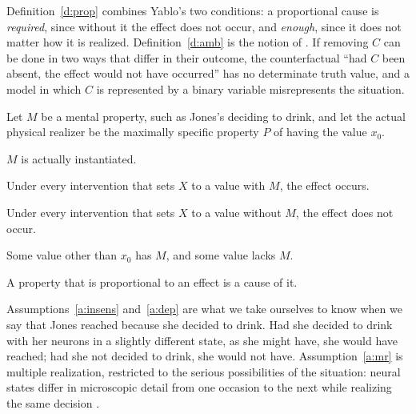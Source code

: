 \documentclass{situationist-preprint}
\begin{document}
Definition~\ref{d:prop} combines Yablo's two conditions: a proportional cause is \emph{required}, since without it the effect does not occur, and \emph{enough}, since it does not matter how it is realized. Definition~\ref{d:amb} is the notion of \citet{SpirtesScheines2004}. If removing $C$ can be done in two ways that differ in their outcome, the counterfactual \enquote{had $C$ been absent, the effect would not have occurred} has no determinate truth value, and a model in which $C$ is represented by a binary variable misrepresents the situation.

Let $M$ be a mental property, such as Jones's deciding to drink, and let the actual physical realizer be the maximally specific property $P$ of having the value $x_0$.

\begin{assumption}\label{a:actual}
$M$ is actually instantiated.
\end{assumption}

\begin{assumption}\label{a:insens}
Under every intervention that sets $X$ to a value with $M$, the effect occurs.
\end{assumption}

\begin{assumption}[Dependence]\label{a:dep}
Under every intervention that sets $X$ to a value without $M$, the effect does not occur.
\end{assumption}

\begin{assumption}\label{a:mr}
Some value other than $x_0$ has $M$, and some value lacks $M$.
\end{assumption}

\begin{principle}\label{p:cause}
A property that is proportional to an effect is a cause of it.
\end{principle}

Assumptions~\ref{a:insens} and~\ref{a:dep} are what we take ourselves to know when we say that Jones reached because she decided to drink. Had she decided to drink with her neurons in a slightly different state, as she might have, she would have reached; had she not decided to drink, she would not have. Assumption~\ref{a:mr} is multiple realization, restricted to the serious possibilities of the situation: neural states differ in microscopic detail from one occasion to the next while realizing the same decision \citep{Putnam1967}.
\end{document}
